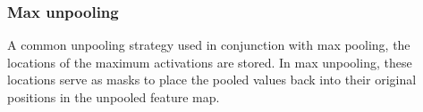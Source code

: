 \subsubsection{Max unpooling} A common unpooling strategy used in conjunction with max pooling, the locations of the maximum activations are stored. In max unpooling, these locations serve as masks to place the pooled values back into their original positions in the unpooled feature map.
